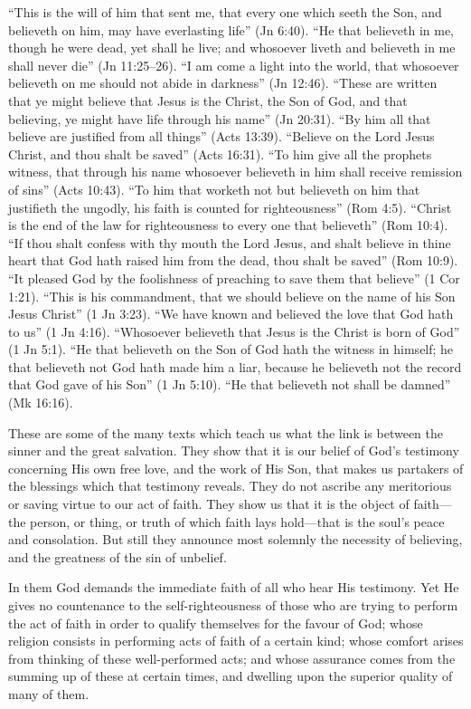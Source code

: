 \documentclass[
]{book}
\begin{document}
``This is the will of him that sent me, that every one which seeth the Son, and believeth on him, may have everlasting life'' (Jn 6:40). ``He that believeth in me, though he were dead, yet shall he live; and whosoever liveth and believeth in me shall never die'' (Jn 11:25--26). ``I am come a light into the world, that whosoever believeth on me should not abide in darkness'' (Jn 12:46). ``These are written that ye might believe that Jesus is the Christ, the Son of God, and that believing, ye might have life through his name'' (Jn 20:31). ``By him all that believe are justified from all things'' (Acts 13:39). ``Believe on the Lord Jesus Christ, and thou shalt be saved'' (Acts 16:31). ``To him give all the prophets witness, that through his name whosoever believeth in him shall receive remission of sins'' (Acts 10:43). ``To him that worketh not but believeth on him that justifieth the ungodly, his faith is counted for righteousness'' (Rom 4:5). ``Christ is the end of the law for righteousness to every one that believeth'' (Rom 10:4). ``If thou shalt confess with thy mouth the Lord Jesus, and shalt believe in thine heart that God hath raised him from the dead, thou shalt be saved'' (Rom 10:9). ``It pleased God by the foolishness of preaching to save them that believe'' (1 Cor 1:21). ``This is his commandment, that we should believe on the name of his Son Jesus Christ'' (1 Jn 3:23). ``We have known and believed the love that God hath to us'' (1 Jn 4:16). ``Whosoever believeth that Jesus is the Christ is born of God'' (1 Jn 5:1). ``He that believeth on the Son of God hath the witness in himself; he that believeth not God hath made him a liar, because he believeth not the record that God gave of his Son'' (1 Jn 5:10). ``He that believeth not shall be damned'' (Mk 16:16).

These are some of the many texts which teach us what the link is between the sinner and the great salvation. They show that it is our belief of God's testimony concerning His own free love, and the work of His Son, that makes us partakers of the blessings which that testimony reveals. They do not ascribe any meritorious or saving virtue to our act of faith. They show us that it is the object of faith---the person, or thing, or truth of which faith lays hold---that is the soul's peace and consolation. But still they announce most solemnly the necessity of believing, and the greatness of the sin of unbelief.

In them God demands the immediate faith of all who hear His testimony. Yet He gives no countenance to the self-righteousness of those who are trying to perform the act of faith in order to qualify themselves for the favour of God; whose religion consists in performing acts of faith of a certain kind; whose comfort arises from thinking of these well-performed acts; and whose assurance comes from the summing up of these at certain times, and dwelling upon the superior quality of many of them.
\end{document}
